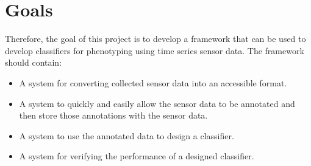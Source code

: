 \section{Goals}
Therefore, the goal of this project is to develop a framework that can be used to develop classifiers for phenotyping using time series sensor data. The framework should contain:

\begin{itemize}
\item A system for converting collected sensor data into an accessible format.

\item A system to quickly and easily allow the sensor data to be annotated and then store those annotations with the sensor data.

\item A system to use the annotated data to design a classifier. 

\item A system for verifying the performance of a designed classifier.
\end{itemize}